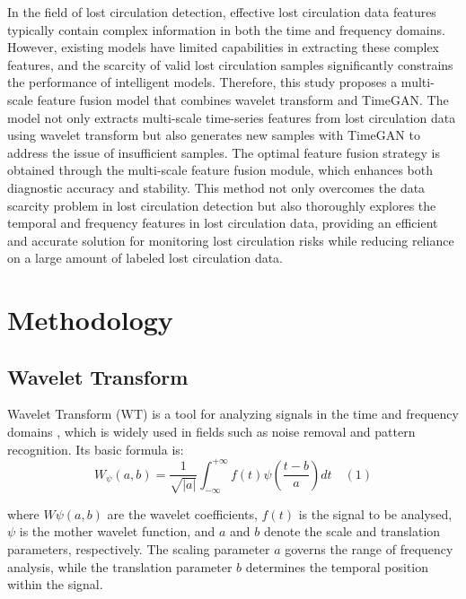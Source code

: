 \documentclass[journal,article,submit,pdftex,moreauthors]{Definitions/mdpi}
\begin{document}
In the field of lost circulation detection, effective lost circulation data features typically contain complex information in both the time and frequency domains. However, existing models have limited capabilities in extracting these complex features, and the scarcity of valid lost circulation samples significantly constrains the performance of intelligent models. Therefore, this study proposes a multi-scale feature fusion model that combines wavelet transform and TimeGAN. The model not only extracts multi-scale time-series features from lost circulation data using wavelet transform but also generates new samples with TimeGAN to address the issue of insufficient samples. The optimal feature fusion strategy is obtained through the multi-scale feature fusion module, which enhances both diagnostic accuracy and stability. This method not only overcomes the data scarcity problem in lost circulation detection but also thoroughly explores the temporal and frequency features in lost circulation data, providing an efficient and accurate solution for monitoring lost circulation risks while reducing reliance on a large amount of labeled lost circulation data.
\section{Methodology}
\subsection{Wavelet Transform}

Wavelet Transform (WT) is a tool for analyzing signals in the time and frequency domains \cite{Grossmann1984}, which is widely used in fields such as noise removal and pattern recognition. Its basic formula is:
\[{{W}_{\psi }}(a,b)=\frac{1}{\sqrt{|a|}}\mathop{\int }_{-\infty }^{+\infty }f(t)\psi (\frac{t-b}{a})dt\quad (1)\]

where $W\psi(a, b)$ are the wavelet coefficients, $f(t)$ is the signal to be analysed, $\psi$ is the mother wavelet function, and $a$ and $b$ denote the scale and translation parameters, respectively. The scaling parameter $a$ governs the range of frequency analysis, while the translation parameter $b$ determines the temporal position within the signal.
\end{document}
